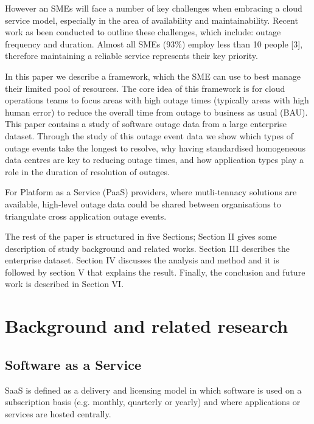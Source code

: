 \documentclass[conference]{IEEEtran}
\begin{document}
However an SMEs will face a number of key challenges when embracing a cloud service model, especially in the area of availability and maintainability. Recent work as been conducted to outline these challenges, which include: outage frequency and duration. Almost all SMEs (93\%) employ less than 10 people [3], therefore maintaining a reliable service represents their key priority. \par

In this paper we describe a framework, which the SME can use to best manage their limited pool of resources. The core idea of this framework is for cloud operations teams to focus areas with high outage times (typically areas with high human error) to reduce the overall time from outage to business as usual (BAU). This paper contains a study of software outage data from a large enterprise dataset. Through the study of this outage event data we show which types of outage events take the longest to resolve, why having standardised homogeneous data centres are key to reducing outage times, and how application types play a role in the duration of resolution of outages. \par

For Platform as a Service (PaaS) providers, where mutli-tennacy solutions are available, high-level outage data could be shared between organisations to triangulate cross application outage events. \par

The rest of the paper is structured in five Sections; Section II gives some description of study background and related works. Section III describes the enterprise dataset. Section IV discusses the analysis and method and it is followed by section V that explains the result. Finally, the conclusion and future work is described in Section VI. \par




\section{Background and related research}

\subsection{Software as a Service}
SaaS is defined as a delivery and licensing model in which software is used on a subscription basis (e.g. monthly, quarterly or yearly) and where applications or services are hosted centrally. \par
\end{document}
